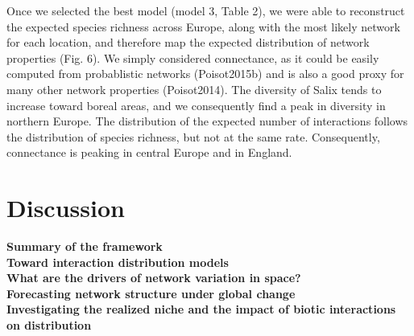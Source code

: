 \documentclass[12pt]{article}
\begin{document}
Once we selected the best model (model 3, Table 2), we were able to
reconstruct the expected species richness across Europe, along with the most
likely network for each location, and therefore map the expected distribution
of network properties (Fig. 6). We simply considered connectance, as it could
be easily computed from probablistic networks (Poisot2015b) and is also a good
proxy for many other network properties (Poisot2014). The diversity of Salix
tends to increase toward boreal areas, and we consequently find a peak in
diversity in northern Europe. The distribution of the expected number of
interactions follows the distribution of species richness, but not at the same
rate. Consequently, connectance is peaking in central Europe and in
England.


\newpage
\section*{Discussion}

\textbf{Summary of the framework}\\

\textbf{Toward interaction distribution models} \\


\textbf{What are the drivers of network variation in space?}\\

\textbf{Forecasting network structure under global change}\\


\textbf{Investigating the realized niche and the impact of biotic interactions on distribution}\\
\end{document}
